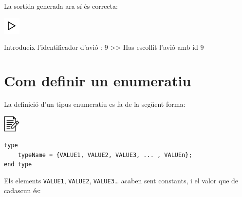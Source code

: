 \documentclass[]{book}
\newenvironment{Shaded}{\begin{snugshade}}{\end{snugshade}}
\newcommand{\DataTypeTok}[1]{\textcolor[rgb]{0.13,0.29,0.53}{#1}}
\newcommand{\DecValTok}[1]{\textcolor[rgb]{0.00,0.00,0.81}{#1}}
\newcommand{\SpecialCharTok}[1]{\textcolor[rgb]{0.00,0.00,0.00}{#1}}
\newcommand{\StringTok}[1]{\textcolor[rgb]{0.31,0.60,0.02}{#1}}
\newcommand{\ImportTok}[1]{#1}
\newcommand{\ControlFlowTok}[1]{\textcolor[rgb]{0.13,0.29,0.53}{\textbf{#1}}}
\newcommand{\PreprocessorTok}[1]{\textcolor[rgb]{0.56,0.35,0.01}{\textit{#1}}}
\newcommand{\NormalTok}[1]{#1}
\begin{document}
\begin{Shaded}
\end{Shaded}

La sortida generada ara sí és correcta:

\includegraphics{./img/play.png}

\begin{Shaded}
\begin{Highlighting}[]
\NormalTok{Introdueix l'identificador d'avió : }\DecValTok{9}
\NormalTok{>> Has escollit l'avió amb id }\DecValTok{9} 
\end{Highlighting}
\end{Shaded}

\section{Com definir un enumeratiu}\label{com-definir-un-enumeratiu}

La definició d'un tipus enumeratiu es fa de la següent forma:

\includegraphics{./img/alg.png}

\begin{verbatim}
type
    typeName = {VALUE1, VALUE2, VALUE3, ... , VALUEn};
end type
\end{verbatim}

Els elements \texttt{VALUE1}, \texttt{VALUE2}, \texttt{VALUE3}\ldots{}
acaben sent constants, i el valor que de cadascun és:
\end{document}

